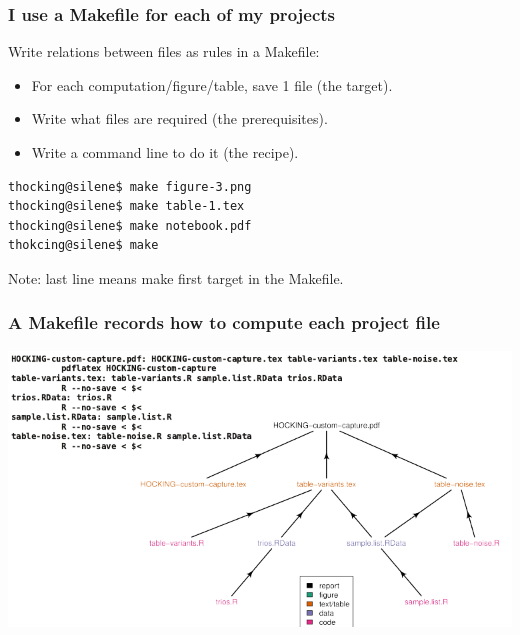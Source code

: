 \documentclass{beamer}
\begin{document}
\begin{frame}[fragile]
  \frametitle{I use a Makefile for each of my projects}
  Write relations between files as rules in a Makefile:
  \begin{itemize}
  \item For each computation/figure/table, save 1 file (the target).
  \item Write what files are required (the prerequisites).
  \item Write a command line to do it (the recipe).
  \end{itemize}
\begin{verbatim}
thocking@silene$ make figure-3.png
thocking@silene$ make table-1.tex
thocking@silene$ make notebook.pdf
thokcing@silene$ make 
\end{verbatim}
Note: last line means make first target in the Makefile.
\end{frame}


\begin{frame}
  \frametitle{A Makefile records how to compute each project file}
  \includegraphics[width=\textwidth]{figure-code-dag}
\end{frame}
\end{document}
